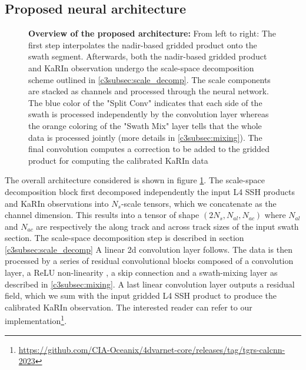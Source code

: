 \begin{bibunit}
\subsection*{Proposed neural architecture}
\label{c3subsec:neural_arch}
\noindent
\begin{figure}
    \begin{center}
    \end{center}
    \caption{\textbf{Overview of the proposed architecture:} From left to right: The first step interpolates the nadir-based gridded product onto the swath segment. Afterwards, both the nadir-based gridded product and KaRIn observation undergo the scale-space decomposition scheme outlined in \ref{c3subsec:scale_decomp}. The scale components are stacked as channels and processed through the neural network. The blue color of the "Split Conv" indicates that each side of the swath is processed independently by the convolution layer whereas the orange coloring of the "Swath Mix" layer tells that the whole data is processed jointly (more details in \ref{c3subsec:mixing}). The final convolution computes a correction to be added to the gridded product for computing the calibrated KaRIn data}
    \label{c3fig:arch}	
\end{figure}
The overall architecture considered is shown in figure \ref{c3fig:arch}. The scale-space decomposition block first decomposed independently the input L4 SSH products and KaRIn observations
into $N_s$-scale tensors, which we concatenate as the channel dimension.
This results into a tensor of shape $(2N_s, N_{al}, N_{ac})$ where $N_{al}$ and $N_{ac}$ are respectively the along track and across track sizes of the input swath section. The scale-space decomposition step is described in section \ref{c3subsec:scale_decomp}
A linear 2{\sc d} convolution layer follows. 
The data is then processed by a series of residual convolutional blocks composed of a convolution layer, a ReLU non-linearity \cite{Nair_Hinton_2019}, a skip connection and a swath-mixing layer as described in \ref{c3subsec:mixing}. A last linear convolution layer outputs a residual field, which we sum with the input gridded L4 SSH product to produce the calibrated KaRIn observation.
The interested reader can refer to our implementation\footnote{\url{https://github.com/CIA-Oceanix/4dvarnet-core/releases/tag/tgrs-calcnn-2023}}.




\end{bibunit}
